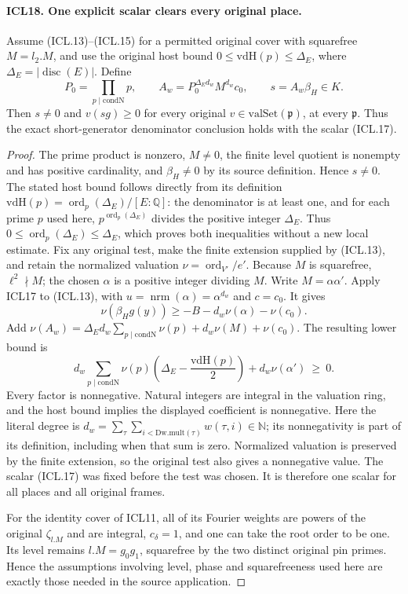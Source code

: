 \paragraph{ICL18. One explicit scalar clears every original place.}
\label{claim:ICL18}
Assume (ICL.13)--(ICL.15) for a permitted original cover
with squarefree \(M=l_2.M\), and use the original host
bound \(0\leq\mathrm{vdH}(p)\leq\Delta_E\), where
\(\Delta_E=|\operatorname{disc}(E)|\).  Define
\[
 P_0=\prod_{p\mid\mathrm{condN}}p,\qquad
 A_w=P_0^{\Delta_E d_w}M^{d_w}c_0,\qquad
 s=A_w\beta_H\in K.                                 \tag{ICL.17}
\]
Then \(s\ne0\) and \(v(sg)\geq0\) for every
original \(v\in\mathrm{valSet}(\mathfrak p)\), at
every \(\mathfrak p\).  Thus the exact short-generator
denominator conclusion holds with the scalar (ICL.17).
\begin{proof}
The prime product is nonzero, \(M\ne0\), the finite
level quotient is nonempty and has positive cardinality,
and \(\beta_H\ne0\) by its source definition.  Hence
\(s\ne0\).  The stated host bound follows directly
from its definition
\(\mathrm{vdH}(p)=\operatorname{ord}_p(\Delta_E)/[E:\mathbb Q]\):
the denominator is at least one, and for each prime
\(p\) used here, \(p^{\operatorname{ord}_p(\Delta_E)}\)
divides the positive integer \(\Delta_E\).  Thus
\(0\leq\operatorname{ord}_p(\Delta_E)\leq\Delta_E\),
which proves both inequalities without a new local
estimate.  Fix any original test, make the finite
extension supplied by (ICL.13), and retain the normalized
valuation \(\nu=\operatorname{ord}_{V'}/e'\).
Because \(M\) is squarefree, \(\ell^2\nmid M\);
the chosen \(\alpha\) is a positive integer dividing
\(M\).  Write \(M=\alpha\alpha'\).
Apply ICL17 to (ICL.13), with
\(u=\operatorname{nrm}(\alpha)=\alpha^{d_w}\)
and \(c=c_0\).  It gives
\[
 \nu(\beta_Hg(y))\geq-B-d_w\nu(\alpha)-\nu(c_0).
\]
Add
\(\nu(A_w)=\Delta_Ed_w\sum_{p\mid\mathrm{condN}}\nu(p)
                  +d_w\nu(M)+\nu(c_0)\).
The resulting lower bound is
\[
 d_w\sum_{p\mid\mathrm{condN}}
        \nu(p)\left(\Delta_E-\frac{\mathrm{vdH}(p)}2\right)
                      +d_w\nu(\alpha')\ \geq\ 0.      \tag{ICL.18}
\]
Every factor is nonnegative.  Natural integers are
integral in the valuation ring, and the host bound
implies the displayed coefficient is nonnegative.
Here the literal degree is
\(d_w=\sum_\tau\sum_{i<\mathrm{Dw.mult}(\tau)}w(\tau,i)\in\mathbb N\);
its nonnegativity is part of its definition, including
when that sum is zero.
Normalized valuation is preserved by the finite
extension, so the original test also gives a
nonnegative value.  The scalar (ICL.17) was fixed
before the test was chosen.  It is therefore one
scalar for all places and all original frames.

For the identity cover of ICL11, all of its Fourier
weights are powers of the original \(\zeta_{l.M}\)
and are integral, \(c_\delta=1\), and one can take
the root order to be one.  Its level remains
\(l.M=g_0g_1\), squarefree by the two distinct
original pin primes.  Hence the assumptions involving
level, phase and squarefreeness used here are exactly
those needed in the source application.
\end{proof}

